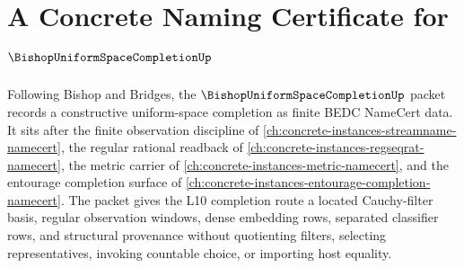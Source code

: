 \chapter{A Concrete Naming Certificate for $\BishopUniformSpaceCompletionUp$}
\label{ch:concrete-instances-bishop-uniform-space-completion-namecert}

Following Bishop and Bridges, the $\BishopUniformSpaceCompletionUp$ packet records a constructive uniform-space completion as finite BEDC NameCert data. It sits after the finite observation discipline of \autoref{ch:concrete-instances-streamname-namecert}, the regular rational readback of \autoref{ch:concrete-instances-regseqrat-namecert}, the metric carrier of \autoref{ch:concrete-instances-metric-namecert}, and the entourage completion surface of \autoref{ch:concrete-instances-entourage-completion-namecert}. The packet gives the L10 completion route a located Cauchy-filter basis, regular observation windows, dense embedding rows, separated classifier rows, and structural provenance without quotienting filters, selecting representatives, invoking countable choice, or importing host equality.


